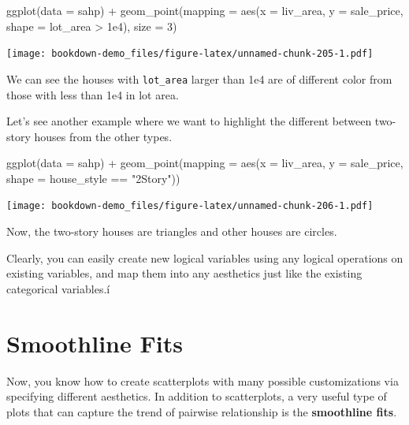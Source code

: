 \documentclass[
]{book}
\newenvironment{Shaded}{\begin{snugshade}}{\end{snugshade}}
\newcommand{\AttributeTok}[1]{\textcolor[rgb]{0.77,0.63,0.00}{#1}}
\newcommand{\DecValTok}[1]{\textcolor[rgb]{0.00,0.00,0.81}{#1}}
\newcommand{\FloatTok}[1]{\textcolor[rgb]{0.00,0.00,0.81}{#1}}
\newcommand{\FunctionTok}[1]{\textcolor[rgb]{0.00,0.00,0.00}{#1}}
\newcommand{\NormalTok}[1]{#1}
\newcommand{\SpecialCharTok}[1]{\textcolor[rgb]{0.00,0.00,0.00}{#1}}
\newcommand{\StringTok}[1]{\textcolor[rgb]{0.31,0.60,0.02}{#1}}
\begin{document}
\begin{Shaded}
\begin{Highlighting}[]
\FunctionTok{ggplot}\NormalTok{(}\AttributeTok{data =}\NormalTok{ sahp) }\SpecialCharTok{+} \FunctionTok{geom\_point}\NormalTok{(}\AttributeTok{mapping =} \FunctionTok{aes}\NormalTok{(}\AttributeTok{x =}\NormalTok{ liv\_area, }\AttributeTok{y =}\NormalTok{ sale\_price, }\AttributeTok{shape =}\NormalTok{ lot\_area }\SpecialCharTok{\textgreater{}} \FloatTok{1e4}\NormalTok{), }\AttributeTok{size =} \DecValTok{3}\NormalTok{)}
\end{Highlighting}
\end{Shaded}

\texttt{[image: bookdown-demo\_files/figure-latex/unnamed-chunk-205-1.pdf]}

We can see the houses with \texttt{lot\_area} larger than 1e4 are of different color from those with less than 1e4 in lot area.

Let's see another example where we want to highlight the different between two-story houses from the other types.

\begin{Shaded}
\begin{Highlighting}[]
\FunctionTok{ggplot}\NormalTok{(}\AttributeTok{data =}\NormalTok{ sahp) }\SpecialCharTok{+} \FunctionTok{geom\_point}\NormalTok{(}\AttributeTok{mapping =} \FunctionTok{aes}\NormalTok{(}\AttributeTok{x =}\NormalTok{ liv\_area, }\AttributeTok{y =}\NormalTok{ sale\_price, }\AttributeTok{shape =}\NormalTok{ house\_style }\SpecialCharTok{==} \StringTok{"2Story"}\NormalTok{))}
\end{Highlighting}
\end{Shaded}

\texttt{[image: bookdown-demo\_files/figure-latex/unnamed-chunk-206-1.pdf]}

Now, the two-story houses are triangles and other houses are circles.

Clearly, you can easily create new logical variables using any logical operations on existing variables, and map them into any aesthetics just like the existing categorical variables.í

\hypertarget{smoothline}{%
\section{Smoothline Fits}\label{smoothline}}

Now, you know how to create scatterplots with many possible customizations via specifying different aesthetics. In addition to scatterplots, a very useful type of plots that can capture the trend of pairwise relationship is the \textbf{smoothline fits}.
\end{document}
